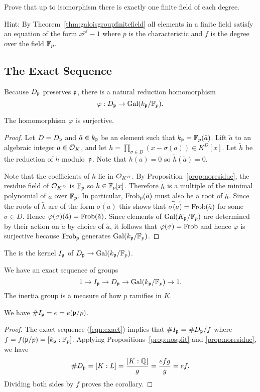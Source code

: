 \begin{exercise}
	Prove that up to isomorphism there is
	exactly one finite field of each degree.
	
	Hint: By Theorem~\ref{thm:galoisgroupfinitefield}
	all elements in a finite field satisfy an equation
	of the form $x^{p^f} - 1$ where $p$ is the
	characteristic and $f$ is the degree over the
	field $\mathbb{F}_p$.
\end{exercise}


\subsection{The Exact Sequence}\label{sec:exactseq}
Because $D_{\mathfrak{p}}$ preserves $\mathfrak{p}$, there is a natural reduction homomorphism
$$
  \varphi:D_{\mathfrak{p}} \to \operatorname{Gal}(k_{\mathfrak{p}}/\mathbb{F}_p).
$$
\begin{theorem}\label{thm:redsurj}
The homomorphism $\varphi$ is surjective.
\end{theorem}
\begin{proof}
Let $D = D_{\mathfrak{p}}$ and $\tilde{a} \in  k_{\mathfrak{p}}$ be an element such that $ k_{\mathfrak{p}} = \mathbb{F}_p(\tilde{a})$.
Lift $\tilde{a}$ to an algebraic integer $a\in \mathcal{O}_K$, and let
$h=\prod_{\sigma\in {D}}(x-\sigma(a))\in K^D[x]$.
Let $\tilde{h}$ be the reduction of $h$ modulo~$\mathfrak{p}$.
Note that $h(a) = 0$ so $\tilde{h}(\tilde{a}) = 0$.

Note that the coefficients of $h$ lie in $\mathcal{O}_{K^D}$.
By Proposition~\ref{prop:noresidue}, the residue field of $\mathcal{O}_{K^D}$
is $\mathbb{F}_p$ so $\tilde{h}\in\mathbb{F}_p[x]$.
Therefore $\tilde{h}$ is a multiple of the minimal polynomial of
$\tilde{a}$ over $\mathbb{F}_p$. In particular, $\operatorname{Frob}_p(\tilde{a})$
must also be a root of $\tilde{h}$.
Since the roots of $\tilde{h}$ are of the form
$\widetilde{\sigma(a)}$ this shows that
$\widetilde{\sigma(a)} = \operatorname{Frob}(\tilde{a})$ for some $\sigma\in D$.
Hence $\varphi(\sigma)(\tilde{a}) = \operatorname{Frob}(\tilde{a})$. Since elements
of $\operatorname{Gal}(K_{\mathfrak{p}}/\mathbb{F}_p)$ are determined by their action on $\tilde{a}$
by choice of $\tilde{a}$, it follows that $\varphi(\sigma) = \operatorname{Frob}$
and hence $\varphi$ is surjective because $\operatorname{Frob}_p$
generates $\operatorname{Gal}(k_{\mathfrak{p}}/\mathbb{F}_p)$.
\end{proof}

\begin{definition}
The  is the kernel $I_{\mathfrak{p}}$ of $D_{\mathfrak{p}}\to\operatorname{Gal}(k_{\mathfrak{p}}/\mathbb{F}_p)$.
\end{definition}
We have an exact sequence of groups
\begin{equation}\label{eqn:exact}
   1 \to I_{\mathfrak{p}} \to D_{\mathfrak{p}} \to \operatorname{Gal}(k_{\mathfrak{p}}/\mathbb{F}_p)\to 1.
\end{equation}
The inertia group is a measure of how $p$ ramifies in $K$.
\begin{corollary}
We have $\# I_{\mathfrak{p}} = e = e(\mathfrak{p}/p)$.
\end{corollary}
\begin{proof}
The exact sequence (\ref{eqn:exact}) implies that
$\#I_{\mathfrak{p}} = \#D_{\mathfrak{p}} / f$ where $f = f(\mathfrak{p}/p) = [k_{\mathfrak{p}} : \mathbb{F}_p]$.
Applying Propositions~\ref{prop:nosplit} and \ref{prop:noresidue}, we have
$$\#D_{\mathfrak{p}} = [K:L] = \frac{[K:\mathbb{Q}]}{g} = \frac{efg}{g} = ef.$$
Dividing both sides by $f$ proves the corollary.
\end{proof}

